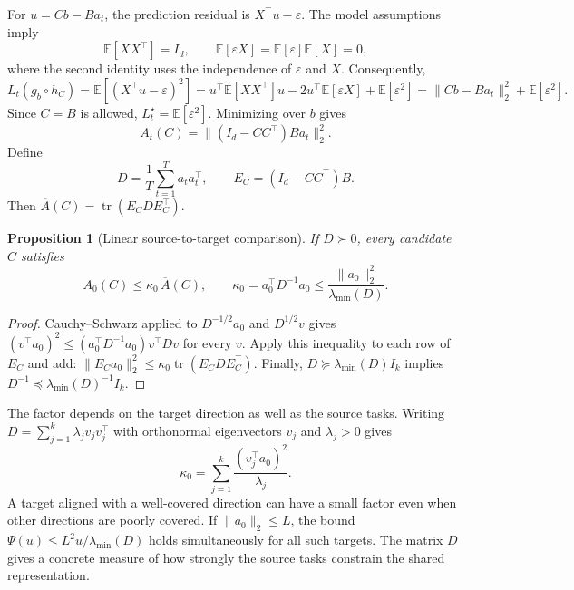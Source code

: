 \documentclass[11pt,twoside]{article}
\newcommand{\E}{\mathbb E}
\newtheorem{proposition}[theorem]{Proposition}
\theoremstyle{definition}
\theoremstyle{remark}
\begin{document}
For $u=Cb-Ba_t$, the prediction residual is $X^\top u-\varepsilon$. The model
assumptions imply
\[
 \E[XX^\top]=I_d,
 \qquad
 \E[\varepsilon X]=\E[\varepsilon]\E[X]=0,
\]
where the second identity uses the independence of $\varepsilon$ and $X$.
Consequently,
\[
 L_t(g_b\circ h_C)
 =\E[(X^\top u-\varepsilon)^2]
 =u^\top\E[XX^\top]u-2u^\top\E[\varepsilon X]+\E[\varepsilon^2]
 =\|Cb-Ba_t\|_2^2+\E[\varepsilon^2].
\]
Since $C=B$ is allowed, $L_t^\star=\E[\varepsilon^2]$.
Minimizing over $b$ gives
\begin{equation}
 A_t(C)=\|(I_d-CC^\top)Ba_t\|_2^2.
 \label{eq:linear-representation-error}
\end{equation}
Define
\begin{equation}
 D=\frac1T\sum_{t=1}^T a_ta_t^\top,
 \qquad E_C=(I_d-CC^\top)B.
 \label{eq:task-diversity-matrix}
\end{equation}
Then $\overline A(C)=\operatorname{tr}(E_CDE_C^\top)$.

\begin{proposition}[Linear source-to-target comparison]
\label{prop:linear-calibration}
If $D\succ0$, every candidate $C$ satisfies
\begin{equation}
 A_0(C)\le\kappa_0\,\overline A(C),
 \qquad
 \kappa_0=a_0^\top D^{-1}a_0
 \le\frac{\|a_0\|_2^2}{\lambda_{\min}(D)}.
 \label{eq:linear-transfer-factor}
\end{equation}
\end{proposition}

\begin{proof}
Cauchy--Schwarz applied to $D^{-1/2}a_0$ and $D^{1/2}v$ gives
$(v^\top a_0)^2\le(a_0^\top D^{-1}a_0)v^\top Dv$ for every $v$.
Apply this inequality to each row of $E_C$ and add:
$\|E_Ca_0\|_2^2\le\kappa_0\operatorname{tr}(E_CDE_C^\top)$.
Finally, $D\succeq\lambda_{\min}(D)I_k$ implies
$D^{-1}\preceq\lambda_{\min}(D)^{-1}I_k$.
\end{proof}

The factor depends on the target direction as well as the source tasks.
Writing $D=\sum_{j=1}^k\lambda_jv_jv_j^\top$ with orthonormal eigenvectors
$v_j$ and $\lambda_j>0$ gives
\[
 \kappa_0=\sum_{j=1}^k\frac{(v_j^\top a_0)^2}{\lambda_j}.
\]
A target aligned with a well-covered direction can have a small factor even
when other directions are poorly covered.
If $\|a_0\|_2\le L$, the bound
$\Psi(u)\le L^2u/\lambda_{\min}(D)$ holds simultaneously for all such
targets.
The matrix $D$ gives a concrete measure of how strongly the source tasks
constrain the shared representation.
\end{document}
